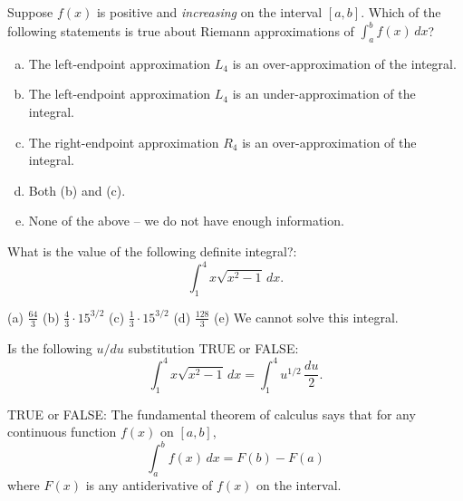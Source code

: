\documentclass[12pt]{article}
\newcommand{\ds}{\displaystyle}
\newenvironment{problem}[2][Problem]{\begin{trivlist}
\item[\hskip \labelsep {\bfseries #1}\hskip \labelsep {\bfseries #2.}]}{\end{trivlist}}
\begin{document}




\begin{problem}{1}
Suppose $f(x)$ is positive and {\it increasing} on the interval $[a,b]$. Which of the following statements is true about Riemann approximations of $\int_{a}^{b}\! f(x)\, dx$? 
\begin{enumerate}[(a)]
  \item The left-endpoint approximation $L_{4}$ is an over-approximation of the integral. 
  \item The left-endpoint approximation $L_{4}$ is an under-approximation of the integral. 
  \item The right-endpoint approximation $R_{4}$ is an over-approximation of the integral. 
  \item Both (b) and (c). 
  \item None of the above -- we do not have enough information. 
\end{enumerate}
\end{problem}

\vspace{1in}

\begin{problem}{2}
What is the value of the following definite integral?: 
$$
\int_{1}^{4}\! x\sqrt{x^{2} - 1}\, dx. 
$$
\begin{center}
  (a) $\ds\frac{64}{3}$ \qquad
  (b) $\ds\frac{4}{3}\cdot 15^{3/2}$ \qquad
  (c) $\ds\frac{1}{3}\cdot 15^{3/2}$ \qquad
  (d) $\ds\frac{128}{3}$ \qquad
  (e) We cannot solve this integral. 
\end{center}
\end{problem}

\vspace{3in}

\begin{problem}{3}
Is the following $u/du$ substitution TRUE or FALSE: 
$$
\int_{1}^{4}\! x\sqrt{x^{2} - 1}\, dx = \int_{1}^{4}\! u^{1/2}\, \frac{du}{2}. 
$$
\end{problem}

\newpage

\begin{problem}{4}
TRUE or FALSE: The fundamental theorem of calculus says that for any continuous function $f(x)$ on $[a,b]$, 
$$
\int_{a}^{b}\! f(x)\, dx = F(b) - F(a)
$$
where $F(x)$ is any antiderivative of $f(x)$ on the interval. 
\end{problem}
\end{document}
